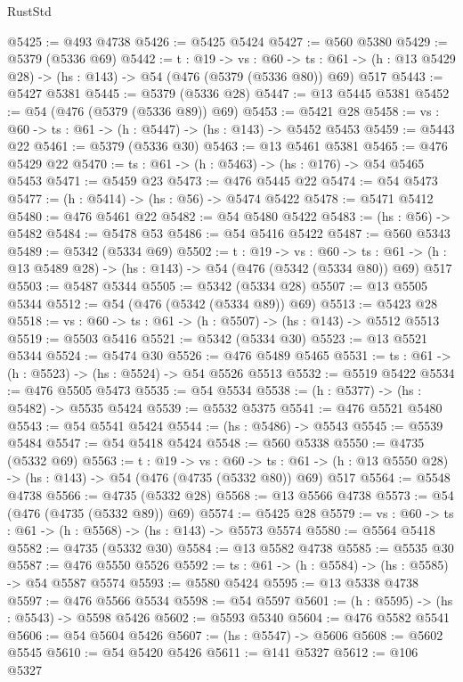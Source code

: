 \begin{lexlean}{RustStd}
\begin{coremodule}
@5425 := @493 @4738
@5426 := @5425 @5424
@5427 := @560 @5380
@5429 := @5379 (@5336 @69)
@5442 := {t : @19} ->
  {vs : @60} ->
  {ts : @61} -> (h : @13 @5429 @28) -> (hs : @143) -> @54 (@476 (@5379 (@5336 @80)) @69) @517
@5443 := @5427 @5381
@5445 := @5379 (@5336 @28)
@5447 := @13 @5445 @5381
@5452 := @54 (@476 (@5379 (@5336 @89)) @69)
@5453 := @5421 @28
@5458 := {vs : @60} -> {ts : @61} -> (h : @5447) -> (hs : @143) -> @5452 @5453
@5459 := @5443 @22
@5461 := @5379 (@5336 @30)
@5463 := @13 @5461 @5381
@5465 := @476 @5429 @22
@5470 := {ts : @61} -> (h : @5463) -> (hs : @176) -> @54 @5465 @5453
@5471 := @5459 @23
@5473 := @476 @5445 @22
@5474 := @54 @5473
@5477 := (h : @5414) -> (hs : @56) -> @5474 @5422
@5478 := @5471 @5412
@5480 := @476 @5461 @22
@5482 := @54 @5480 @5422
@5483 := (hs : @56) -> @5482
@5484 := @5478 @53
@5486 := @54 @5416 @5422
@5487 := @560 @5343
@5489 := @5342 (@5334 @69)
@5502 := {t : @19} ->
  {vs : @60} ->
  {ts : @61} -> (h : @13 @5489 @28) -> (hs : @143) -> @54 (@476 (@5342 (@5334 @80)) @69) @517
@5503 := @5487 @5344
@5505 := @5342 (@5334 @28)
@5507 := @13 @5505 @5344
@5512 := @54 (@476 (@5342 (@5334 @89)) @69)
@5513 := @5423 @28
@5518 := {vs : @60} -> {ts : @61} -> (h : @5507) -> (hs : @143) -> @5512 @5513
@5519 := @5503 @5416
@5521 := @5342 (@5334 @30)
@5523 := @13 @5521 @5344
@5524 := @5474 @30
@5526 := @476 @5489 @5465
@5531 := {ts : @61} -> (h : @5523) -> (hs : @5524) -> @54 @5526 @5513
@5532 := @5519 @5422
@5534 := @476 @5505 @5473
@5535 := @54 @5534
@5538 := (h : @5377) -> (hs : @5482) -> @5535 @5424
@5539 := @5532 @5375
@5541 := @476 @5521 @5480
@5543 := @54 @5541 @5424
@5544 := (hs : @5486) -> @5543
@5545 := @5539 @5484
@5547 := @54 @5418 @5424
@5548 := @560 @5338
@5550 := @4735 (@5332 @69)
@5563 := {t : @19} ->
  {vs : @60} ->
  {ts : @61} -> (h : @13 @5550 @28) -> (hs : @143) -> @54 (@476 (@4735 (@5332 @80)) @69) @517
@5564 := @5548 @4738
@5566 := @4735 (@5332 @28)
@5568 := @13 @5566 @4738
@5573 := @54 (@476 (@4735 (@5332 @89)) @69)
@5574 := @5425 @28
@5579 := {vs : @60} -> {ts : @61} -> (h : @5568) -> (hs : @143) -> @5573 @5574
@5580 := @5564 @5418
@5582 := @4735 (@5332 @30)
@5584 := @13 @5582 @4738
@5585 := @5535 @30
@5587 := @476 @5550 @5526
@5592 := {ts : @61} -> (h : @5584) -> (hs : @5585) -> @54 @5587 @5574
@5593 := @5580 @5424
@5595 := @13 @5338 @4738
@5597 := @476 @5566 @5534
@5598 := @54 @5597
@5601 := (h : @5595) -> (hs : @5543) -> @5598 @5426
@5602 := @5593 @5340
@5604 := @476 @5582 @5541
@5606 := @54 @5604 @5426
@5607 := (hs : @5547) -> @5606
@5608 := @5602 @5545
@5610 := @54 @5420 @5426
@5611 := @141 @5327
@5612 := @106 @5327

\end{coremodule}
\end{lexlean}
